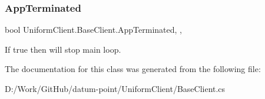 \subsubsection{\texorpdfstring{App\+Terminated}{AppTerminated}}
{\footnotesize\ttfamily bool Uniform\+Client.\+Base\+Client.\+App\+Terminated\hspace{0.3cm}{\ttfamily [static]}, {\ttfamily [get]}, {\ttfamily [set]}}



If true then will stop main loop. 



The documentation for this class was generated from the following file\+:\begin{DoxyCompactItemize}
\item 
D\+:/\+Work/\+Git\+Hub/datum-\/point/\+Uniform\+Client/Base\+Client.\+cs\end{DoxyCompactItemize}
